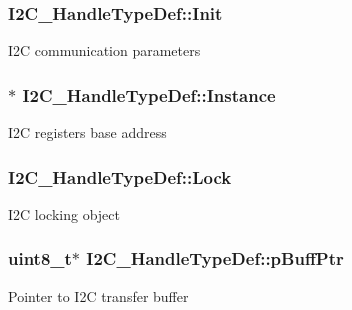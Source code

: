 \subsubsection[{\texorpdfstring{Init}{Init}}]{ I2\+C\+\_\+\+Handle\+Type\+Def\+::\+Init}\hypertarget{struct_i2_c___handle_type_def_a86c7e0e7be29686399208f9bb07ae2a2}{}\label{struct_i2_c___handle_type_def_a86c7e0e7be29686399208f9bb07ae2a2}
I2C communication parameters 
\subsubsection[{\texorpdfstring{Instance}{Instance}}]{$\ast$ I2\+C\+\_\+\+Handle\+Type\+Def\+::\+Instance}\hypertarget{struct_i2_c___handle_type_def_ad83b15a12a41fb3958c55085adf931dd}{}\label{struct_i2_c___handle_type_def_ad83b15a12a41fb3958c55085adf931dd}
I2C registers base address 
\subsubsection[{\texorpdfstring{Lock}{Lock}}]{ I2\+C\+\_\+\+Handle\+Type\+Def\+::\+Lock}\hypertarget{struct_i2_c___handle_type_def_af28a07c34f97e2b2ade505357a467a50}{}\label{struct_i2_c___handle_type_def_af28a07c34f97e2b2ade505357a467a50}
I2C locking object 
\subsubsection[{\texorpdfstring{p\+Buff\+Ptr}{pBuffPtr}}]{\setlength{\rightskip}{0pt plus 5cm}uint8\+\_\+t$\ast$ I2\+C\+\_\+\+Handle\+Type\+Def\+::p\+Buff\+Ptr}\hypertarget{struct_i2_c___handle_type_def_a6adc95451a3eec4b104564fc3fe8b109}{}\label{struct_i2_c___handle_type_def_a6adc95451a3eec4b104564fc3fe8b109}
Pointer to I2C transfer buffer 

